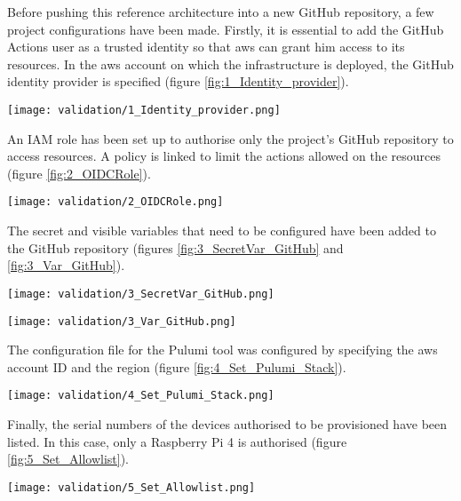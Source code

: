 Before pushing this reference architecture into a new GitHub repository, a few project configurations have been made. Firstly, it is essential to add the GitHub Actions user as a trusted identity so that \gls{aws} can grant him access to its resources. In the \gls{aws} account on which the infrastructure is deployed, the GitHub identity provider is specified (figure \ref{fig:1_Identity_provider}).
\begin{center}
    \begingroup
    \texttt{[image: validation/1\_Identity\_provider.png]}
    \label{fig:1_Identity_provider}
    \endgroup
\end{center}
An IAM role has been set up to authorise only the project's GitHub repository to access resources. A policy is linked to limit the actions allowed on the resources (figure \ref{fig:2_OIDCRole}).
\begin{center}
    \begingroup
    \texttt{[image: validation/2\_OIDCRole.png]}
    \label{fig:2_OIDCRole}
    \endgroup
\end{center}
The secret and visible variables that need to be configured have been added to the GitHub repository (figures \ref{fig:3_SecretVar_GitHub} and \ref{fig:3_Var_GitHub}).
\begin{center}
    \begingroup
    \texttt{[image: validation/3\_SecretVar\_GitHub.png]}
    \label{fig:3_SecretVar_GitHub}
    \endgroup
\end{center}
\begin{center}
    \begingroup
    \texttt{[image: validation/3\_Var\_GitHub.png]}
    \label{fig:3_Var_GitHub}
    \endgroup
\end{center}
The configuration file for the Pulumi tool was configured by specifying the \gls{aws} account ID and the region (figure \ref{fig:4_Set_Pulumi_Stack}).
\begin{center}
    \begingroup
    \texttt{[image: validation/4\_Set\_Pulumi\_Stack.png]}
    \label{fig:4_Set_Pulumi_Stack}
    \endgroup
\end{center}
Finally, the serial numbers of the devices authorised to be provisioned have been listed. In this case, only a Raspberry Pi 4 is authorised (figure \ref{fig:5_Set_Allowlist}).
\begin{center}
    \begingroup
    \texttt{[image: validation/5\_Set\_Allowlist.png]}
    \label{fig:5_Set_Allowlist}
    \endgroup
\end{center}

